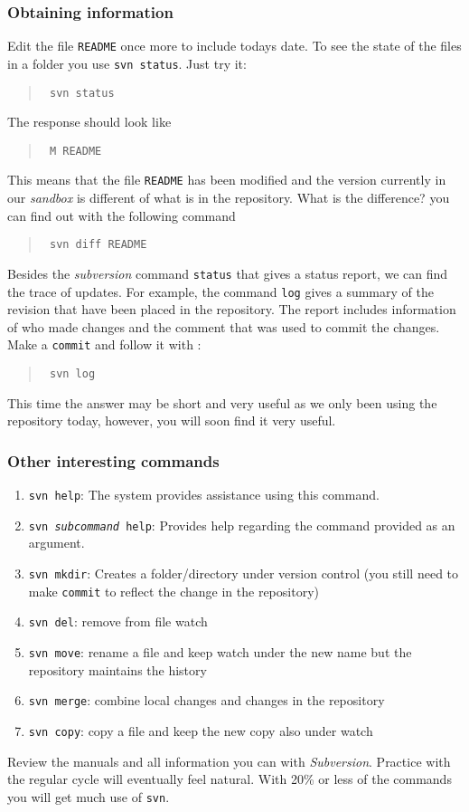 \documentclass[article,12pt]{article}
\begin{document}
\subsubsection*{Obtaining information}
Edit the file  {\tt README} once more to include todays date.
To see the state of the files in a folder you use
{\tt svn status}. Just try it:
\begin{quote}
{\tt
 svn status
}
\end{quote}
The response should look like
\begin{quote}
{\tt
M      README
}
\end{quote}
This means that the file
{\tt  README} has been modified and the
version currently in our  {\em sandbox} is different of what is
in the repository.
What is the difference? you can find out with the following command
\begin{quote}
{\tt
svn diff README
}
\end{quote}

Besides the {\em subversion} command
{\tt  status} that gives a status report,
we can find the trace of updates.
For example, the command
{\tt log} gives a summary of the revision that have been placed in
the repository.
The report includes information of who made changes and the
comment that was used to commit the changes.
Make a {\tt commit} and follow it with :
\begin{quote}
{\tt
svn log
}
\end{quote}
This time the answer may be short and very useful as we
only been using the repository today, however, you will soon find
it very useful.

\subsubsection*{Other interesting commands }
\begin{enumerate}
    \item 
{\tt svn help}: The system provides assistance using this command.
    \item {\tt svn {\em subcommand} help}:
Provides help regarding the command provided as an argument.
\item
    {\tt svn mkdir}: Creates a folder/directory
under version control
 (you still need to make {\tt commit} to reflect the change in the repository)
    \item {\tt svn del}: remove from file watch
    \item {\tt svn move}: rename a file and keep watch under the new name 
but the repository maintains the history
    \item {\tt svn merge}: combine local changes and changes
in the repository
    \item {\tt svn copy}: copy a file and keep the new copy
also under watch
\end{enumerate}
Review the manuals and all information you can with
{\em Subversion}. Practice with the regular cycle will eventually
feel natural. With 20\%  or less of the commands you will
get much use of {\tt svn}.
\end{document}
